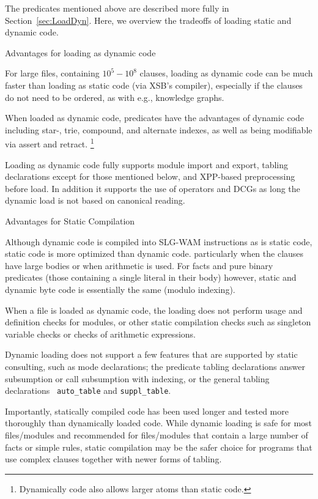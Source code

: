 The predicates mentioned above are described more fully in
Section~\ref{sec:LoadDyn}.  Here, we overview the tradeoffs of
loading static and dynamic code.

\bi
\item Advantages for loading as dynamic code
\bi
\item For large files, containing $10^5-10^8$ clauses, loading as
  dynamic code can be much faster than loading as static code (via
  XSB's compiler), especially if the clauses do not need to be
  ordered, as with e.g., knowledge graphs.
%
\item When loaded as dynamic code, predicates have the advantages of
  dynamic code including star-, trie, compound, and alternate indexes,
  as well as being modifiable via assert and
  retract. \footnote{Dynamically code also allows larger atoms than
    static code.}
  \item Loading as dynamic code fully supports module import and
    export, tabling declarations except for those mentioned below, and
    XPP-based preprocessing before load.  In addition it supports the
    use of operators and DCGs as long the dynamic load is not based on
    canonical reading.
    \ei
\item Advantages for Static Compilation
\bi
\item Although dynamic code is compiled into SLG-WAM instructions as
  is static code, static code is more optimized than dynamic code.
  particularly when the clauses have large bodies or when arithmetic
  is used.  For facts and pure binary predicates (those containing a
  single literal in their body) however, static and dynamic byte code
  is essentially the same (modulo indexing).
\item When a file is loaded as dynamic code, the loading does not
  perform usage and definition checks for modules, or other static
  compilation checks such as singleton variable checks or checks of
  arithmetic expressions.
\item Dynamic loading does not support a few features that are
  supported by static consulting, such as mode declarations; the
  predicate tabling declarations answer subsumption or call
  subsumption with indexing, or the general tabling declarations {\tt
    auto\_table} and {\tt suppl\_table}.  
\item Importantly, statically compiled code has been used longer and
  tested more thoroughly than dynamically loaded code.  While dynamic
  loading is safe for most files/modules and recommended for
  files/modules that contain a large number of facts or simple rules,
  static compilation may be the safer choice for programs that use
  complex clauses together with newer forms of tabling.  \ei \ei

